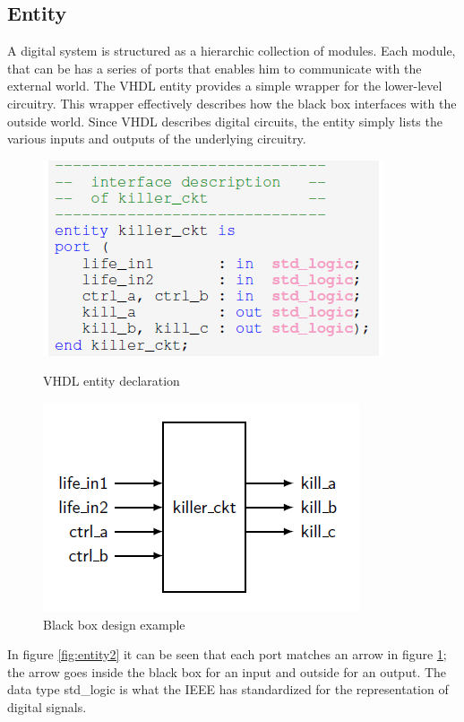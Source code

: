 \subsection{Entity}
\noindent A digital system is structured as a hierarchic collection of modules. Each module, that can be  has a series of ports that enables him to communicate with the external world. The VHDL entity provides a simple wrapper for the
lower-level circuitry. This wrapper effectively describes how the black box interfaces with the outside world. Since VHDL describes digital circuits, the entity simply lists the various inputs and outputs of the underlying circuitry.
\begin{figure}
	\centering
	\begin{minipage}{.5\textwidth}
		\centering
		\includegraphics[width=.7\linewidth]{IMG/ch3/ENTITY2}
		\caption{VHDL entity declaration}
		\label{fig:entity2}
	\end{minipage}%
	\begin{minipage}{.5\textwidth}
		\centering
		\includegraphics[width=.62\linewidth]{IMG/ch3/ENTITY1}
		\caption{Black box design example}
		\label{fig:entity1}
	\end{minipage}
\end{figure}
\noindent In figure \ref{fig:entity2} it can be seen that each port matches an arrow in figure \ref{fig:entity1}; the arrow goes inside the black box for an input and outside for an output. The data type std\_logic is what the IEEE has standardized for the representation of digital signals. 

